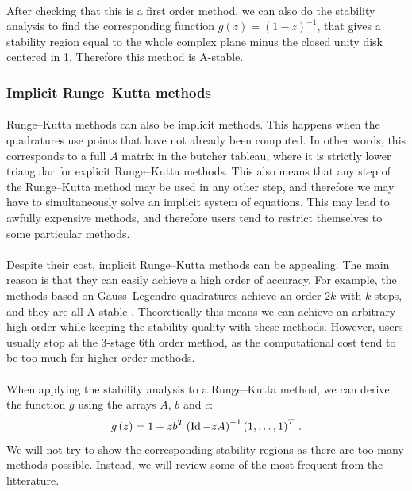         \paragraph{}
        After checking that this is a first order method, we can also do the stability analysis to find the corresponding function $g\left(z\right) = \left(1 - z\right)^{-1}$, that gives a stability region equal to the whole complex plane minus the closed unity disk centered in 1.
        Therefore this method is A-stable.


      \subsubsection{Implicit Runge--Kutta methods}

        \paragraph{}
        Runge--Kutta methods can also be implicit methods.
        This happens when the quadratures use points that have not already been computed.
        In other words, this corresponds to a full $A$ matrix in the butcher tableau, where it is strictly lower triangular for explicit Runge--Kutta methods.
        This also means that any step of the Runge--Kutta method may be used in any other step, and therefore we may have to simultaneously solve an implicit system of equations.
        This may lead to awfully expensive methods, and therefore users tend to restrict themselves to some particular methods.

        \paragraph{}
        Despite their cost, implicit Runge--Kutta methods can be appealing.
        The main reason is that they can easily achieve a high order of accuracy.
        For example, the methods based on Gauss--Legendre quadratures achieve an order $2k$ with $k$ steps, and they are all A-stable \cite{Iserles2008}.
        Theoretically this means we can achieve an arbitrary high order while keeping the stability quality with these methods.
        However, users usually stop at the 3-stage 6th order method, as the computational cost tend to be too much for higher order methods.

        \paragraph{}
        When applying the stability analysis to a Runge--Kutta method, we can derive the function $g$ using the arrays $A$, $b$ and $c$:
        \begin{equation}
          g\left(z\right) = 1 + z {b}^T \left(\operatorname{Id} - zA\right)^{-1} {\left(1, \dots, 1\right)}^T \ .
        \end{equation}
        We will not try to show the corresponding stability regions as there are too many methods possible.
        Instead, we will review some of the most frequent from the litterature.

